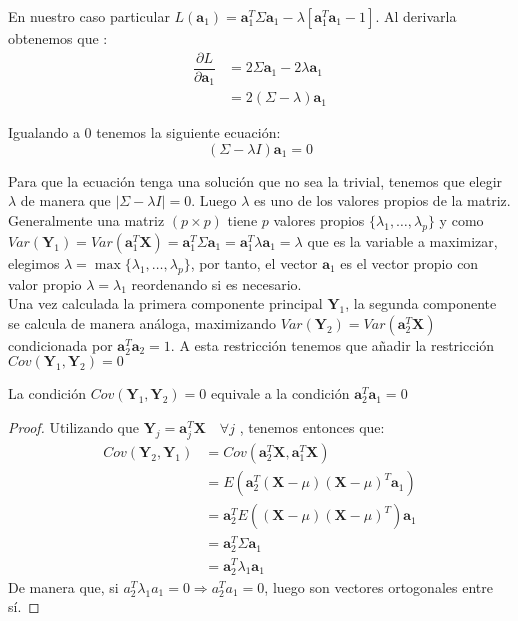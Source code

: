\noindent En nuestro caso particular $L(\textbf{a}_1)=\textbf{a}_1^T \Sigma \textbf{a}_1 - \lambda[\textbf{a}_1^T \textbf{a}_1-1]$. Al derivarla obtenemos que :
\begin{align*}
\dfrac{\partial L}{\partial \textbf{a}_1} &= 2\Sigma \textbf{a}_1 - 2\lambda\textbf{a}_1\\
& = 2(\Sigma-\lambda)\textbf{a}_1 
\end{align*}

\noindent Igualando a 0 tenemos la siguiente ecuación: 
\begin{equation}
(\Sigma-\lambda I)\textbf{a}_1=0
\end{equation}

\noindent Para que la ecuación tenga una solución que no sea la trivial, tenemos que elegir $\lambda$ de manera que $|\Sigma-\lambda I| = 0$. Luego $\lambda$ es uno de los valores propios de la matriz. Generalmente una matriz $(p\times p)$ tiene $p$ valores propios $\lbrace\lambda_1, \ldots ,\lambda_p \rbrace$ y como $Var(\textbf{Y}_1)=Var(\textbf{a}_1^T\textbf{X})= \textbf{a}_1^T \Sigma \textbf{a}_1 =\textbf{a}_1^T \lambda \textbf{a}_1=\lambda$ que es la variable a maximizar, elegimos $\lambda=\max \lbrace\lambda_1, \ldots ,\lambda_p \rbrace$, por tanto, el vector $\textbf{a}_1$ es el vector propio con valor propio $\lambda=\lambda_1$ reordenando si es necesario.\\

\noindent Una vez calculada la primera componente principal $\textbf{Y}_1$, la segunda componente se calcula de manera análoga, maximizando $Var(\textbf{Y}_2)=Var(\textbf{a}_2^T\textbf{X})$ condicionada por $\textbf{a}_2^T\textbf{a}_2=1$. A esta restricción tenemos que añadir la restricción $Cov(\textbf{Y}_1,\textbf{Y}_2)=0 $

\begin{propo}
La condición $Cov(\textbf{Y}_1,\textbf{Y}_2)=0 $ equivale a la condición $\textbf{a}_2^T\textbf{a}_1 = 0$
\end{propo}
\begin{proof}
Utilizando que $\textbf{Y}_j=\textbf{a}_j^T \textbf{X}\quad \forall j$ , tenemos entonces que:
\begin{align*}
Cov(\textbf{Y}_2,\textbf{Y}_1)&= Cov (\textbf{a}_2^T\textbf{X},\textbf{a}_1^T\textbf{X})\\ 
&= E(\textbf{a}_2^T(\textbf{X}-\mu)(\textbf{X}-\mu)^T \textbf{a}_1)\\
&= \textbf{a}_2^T E((\textbf{X}-\mu)(\textbf{X}-\mu)^T) \textbf{a}_1\\
&= \textbf{a}_2^T \Sigma \textbf{a}_1 \\
&= \textbf{a}_2^T \lambda_1 \textbf{a}_1
\end{align*}
\noindent De manera que, si $a_2^T \lambda_1 a_1 = 0 \Rightarrow a_2^T a_1=0 $, luego son vectores ortogonales entre sí.
\end{proof}

